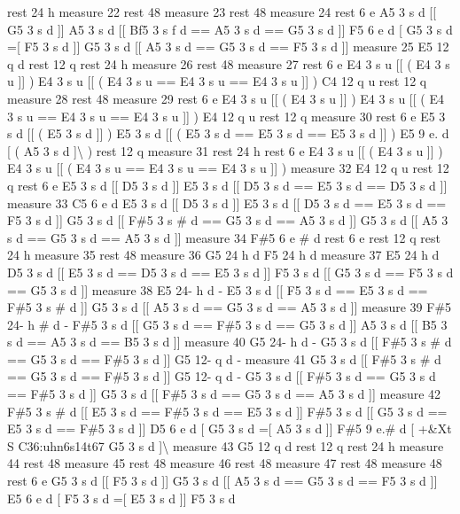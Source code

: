 rest 24 h measure 22 rest 48 measure 23 rest 48 measure 24 rest 6 e A5 3 s d \mbox{[}\mbox{[} G5 3 s d \mbox{]}\mbox{]} A5 3 s d \mbox{[}\mbox{[} Bf5 3 s f d == A5 3 s d == G5 3 s d \mbox{]}\mbox{]} F5 6 e d \mbox{[} G5 3 s d =\mbox{[} F5 3 s d \mbox{]}\mbox{]} G5 3 s d \mbox{[}\mbox{[} A5 3 s d == G5 3 s d == F5 3 s d \mbox{]}\mbox{]} measure 25 E5 12 q d rest 12 q rest 24 h measure 26 rest 48 measure 27 rest 6 e E4 3 s u \mbox{[}\mbox{[} ( E4 3 s u \mbox{]}\mbox{]} ) E4 3 s u \mbox{[}\mbox{[} ( E4 3 s u == E4 3 s u == E4 3 s u \mbox{]}\mbox{]} ) C4 12 q u rest 12 q measure 28 rest 48 measure 29 rest 6 e E4 3 s u \mbox{[}\mbox{[} ( E4 3 s u \mbox{]}\mbox{]} ) E4 3 s u \mbox{[}\mbox{[} ( E4 3 s u == E4 3 s u == E4 3 s u \mbox{]}\mbox{]} ) E4 12 q u rest 12 q measure 30 rest 6 e E5 3 s d \mbox{[}\mbox{[} ( E5 3 s d \mbox{]}\mbox{]} ) E5 3 s d \mbox{[}\mbox{[} ( E5 3 s d == E5 3 s d == E5 3 s d \mbox{]}\mbox{]} ) E5 9 e. d \mbox{[} ( A5 3 s d \mbox{]}\textbackslash{} ) rest 12 q measure 31 rest 24 h rest 6 e E4 3 s u \mbox{[}\mbox{[} ( E4 3 s u \mbox{]}\mbox{]} ) E4 3 s u \mbox{[}\mbox{[} ( E4 3 s u == E4 3 s u == E4 3 s u \mbox{]}\mbox{]} ) measure 32 E4 12 q u rest 12 q rest 6 e E5 3 s d \mbox{[}\mbox{[} D5 3 s d \mbox{]}\mbox{]} E5 3 s d \mbox{[}\mbox{[} D5 3 s d == E5 3 s d == D5 3 s d \mbox{]}\mbox{]} measure 33 C5 6 e d E5 3 s d \mbox{[}\mbox{[} D5 3 s d \mbox{]}\mbox{]} E5 3 s d \mbox{[}\mbox{[} D5 3 s d == E5 3 s d == F5 3 s d \mbox{]}\mbox{]} G5 3 s d \mbox{[}\mbox{[} F\#5 3 s \# d == G5 3 s d == A5 3 s d \mbox{]}\mbox{]} G5 3 s d \mbox{[}\mbox{[} A5 3 s d == G5 3 s d == A5 3 s d \mbox{]}\mbox{]} measure 34 F\#5 6 e \# d rest 6 e rest 12 q rest 24 h measure 35 rest 48 measure 36 G5 24 h d F5 24 h d measure 37 E5 24 h d D5 3 s d \mbox{[}\mbox{[} E5 3 s d == D5 3 s d == E5 3 s d \mbox{]}\mbox{]} F5 3 s d \mbox{[}\mbox{[} G5 3 s d == F5 3 s d == G5 3 s d \mbox{]}\mbox{]} measure 38 E5 24-\/ h d -\/ E5 3 s d \mbox{[}\mbox{[} F5 3 s d == E5 3 s d == F\#5 3 s \# d \mbox{]}\mbox{]} G5 3 s d \mbox{[}\mbox{[} A5 3 s d == G5 3 s d == A5 3 s d \mbox{]}\mbox{]} measure 39 F\#5 24-\/ h \# d -\/ F\#5 3 s d \mbox{[}\mbox{[} G5 3 s d == F\#5 3 s d == G5 3 s d \mbox{]}\mbox{]} A5 3 s d \mbox{[}\mbox{[} B5 3 s d == A5 3 s d == B5 3 s d \mbox{]}\mbox{]} measure 40 G5 24-\/ h d -\/ G5 3 s d \mbox{[}\mbox{[} F\#5 3 s \# d == G5 3 s d == F\#5 3 s d \mbox{]}\mbox{]} G5 12-\/ q d -\/ measure 41 G5 3 s d \mbox{[}\mbox{[} F\#5 3 s \# d == G5 3 s d == F\#5 3 s d \mbox{]}\mbox{]} G5 12-\/ q d -\/ G5 3 s d \mbox{[}\mbox{[} F\#5 3 s d == G5 3 s d == F\#5 3 s d \mbox{]}\mbox{]} G5 3 s d \mbox{[}\mbox{[} F\#5 3 s d == G5 3 s d == A5 3 s d \mbox{]}\mbox{]} measure 42 F\#5 3 s \# d \mbox{[}\mbox{[} E5 3 s d == F\#5 3 s d == E5 3 s d \mbox{]}\mbox{]} F\#5 3 s d \mbox{[}\mbox{[} G5 3 s d == E5 3 s d == F\#5 3 s d \mbox{]}\mbox{]} D5 6 e d \mbox{[} G5 3 s d =\mbox{[} A5 3 s d \mbox{]}\mbox{]} F\#5 9 e.\# d \mbox{[} +\&Xt S C36\+:uhn6s14t67 G5 3 s d \mbox{]}\textbackslash{} measure 43 G5 12 q d rest 12 q rest 24 h measure 44 rest 48 measure 45 rest 48 measure 46 rest 48 measure 47 rest 48 measure 48 rest 6 e G5 3 s d \mbox{[}\mbox{[} F5 3 s d \mbox{]}\mbox{]} G5 3 s d \mbox{[}\mbox{[} A5 3 s d == G5 3 s d == F5 3 s d \mbox{]}\mbox{]} E5 6 e d \mbox{[} F5 3 s d =\mbox{[} E5 3 s d \mbox{]}\mbox{]} F5 3 s d 